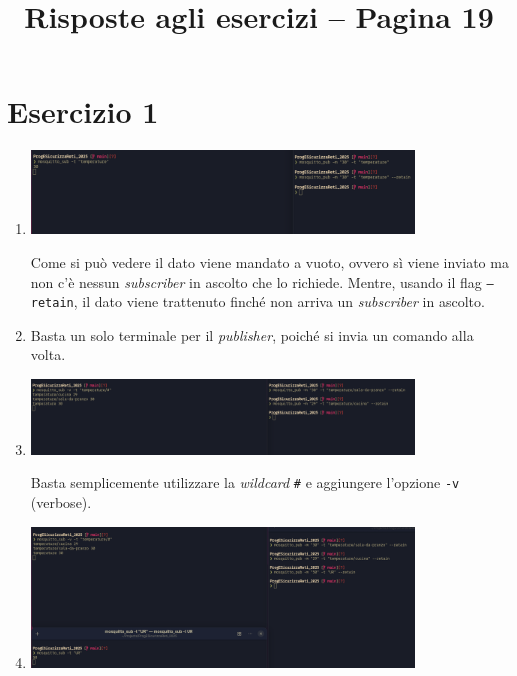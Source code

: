 \documentclass{article}
\title{Risposte agli esercizi – Pagina 19}
\author{}
\date{}
\begin{document}
\maketitle

\section*{Esercizio 1}
\begin{enumerate}[label=\textbf{(\arabic*)}]
\item

\begin{center}
\includegraphics[width=0.8\textwidth]{pub.png}
\end{center}

Come si può vedere il dato viene mandato a vuoto, ovvero sì viene
inviato ma non c'è nessun \emph{subscriber} in ascolto che lo richiede.
Mentre, usando il flag \texttt{--retain}, il dato viene trattenuto
finché non arriva un \emph{subscriber} in ascolto.

\item
Basta un solo terminale per il \emph{publisher}, poiché si invia un
comando alla volta.

\item

\begin{center}
\includegraphics[width=0.8\textwidth]{sub_wildcard.png}
\end{center}

Basta semplicemente utilizzare la \emph{wildcard} \texttt{\#} e
aggiungere l'opzione \texttt{-v} (verbose).

\item

\begin{center}
\includegraphics[width=0.8\textwidth]{4term.png}
\end{center}


\end{enumerate}
\end{document}
